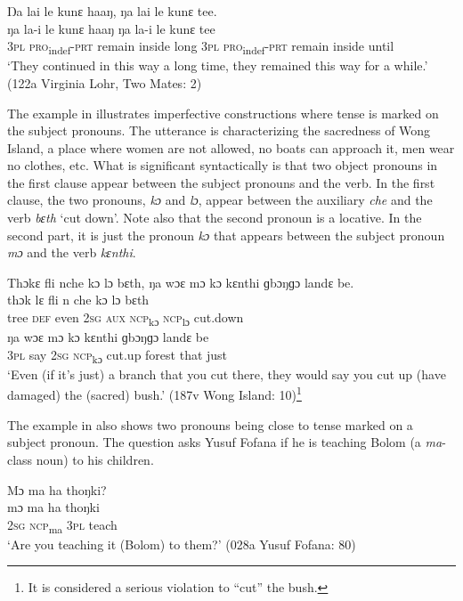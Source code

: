 \newpage
    \ex\label{ex:211b}  Ŋa lai le kunɛ haaŋ, ŋa lai le kunɛ tee.\\
    \gll ŋa    la-i        le      kunɛ    haaŋ  ŋa    la-i        le      kunɛ    tee\\
    \textsc{3pl}    \textsc{pro}\textsubscript{indef}{}-\textsc{prt}    remain  inside    long  3\textsc{pl}  \textsc{pro}\textsubscript{indef}{}-\textsc{prt}    remain  inside    until\\
    \glt ‘They continued in this way a long time, they remained this way for a while.' (122a Virginia Lohr, Two Mates: 2)
\z
\z

The example in  illustrates imperfective constructions where tense is marked on the subject pronouns. The utterance is characterizing the sacredness of Wong Island, a place where women are not allowed, no boats can approach it, men wear no clothes, etc. What is significant syntactically is that two object pronouns in the first clause appear between the subject pronouns and the verb. In the first clause, the two pronouns, \textit{kɔ} and \textit{lɔ}, appear between the auxiliary \textit{che} and the verb \textit{bɛth} ‘cut down'. Note also that the second pronoun is a locative. In the second part, it is just the pronoun \textit{kɔ} that appears between the subject pronoun \textit{mɔ} and the verb \textit{kɛnthi}.

\ea%
    \label{ex:212}
    Thɔkɛ fli nche kɔ lɔ bɛth, ŋa wɔɛ mɔ kɔ kɛnthi ɡbɔŋɡɔ landɛ be.\\
    \gll thɔk  lɛ    fli    n    che  kɔ      lɔ      bɛth\\
    tree  \textsc{def}  even  \textsc{2sg}  \textsc{aux}  \textsc{ncp}\textsubscript{kɔ}    \textsc{ncp}\textsubscript{lɔ}    cut.down\\
    \gll ŋa    wɔɛ  mɔ  kɔ      kɛnthi  ɡbɔŋɡɔ  landɛ    be\\
    \textsc{3pl}  say  \textsc{2sg}  \textsc{ncp}\textsubscript{kɔ}    cut.up  forest    that    just\\
    \glt ‘Even (if it's just) a branch that you cut there, they would say you cut up (have damaged) the (sacred) bush.' (187v Wong Island: 10)\footnote{It is considered a serious violation to “cut” the bush.}
\z

The example in  also shows two pronouns being close to tense marked on a subject pronoun. The question asks Yusuf Fofana if he is teaching Bolom (a \textit{ma}{}-class noun) to his children.

\ea%
    \label{ex:213}
    Mɔ ma ha thoŋki?\\
    \gll mɔ  ma    ha    thoŋki\\
    2\textsc{sg}  \textsc{ncp}\textsubscript{ma} \textsc{3pl}  teach\\
    \glt ‘Are you teaching it (Bolom) to them?' (028a Yusuf Fofana: 80)
\z

